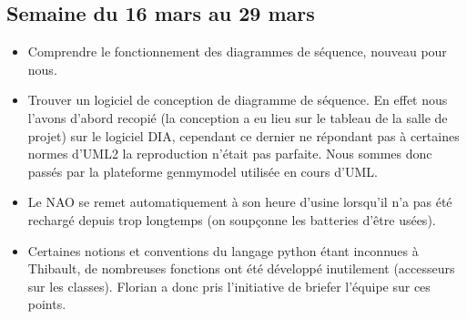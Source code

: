   \subsection{Semaine du 16 mars au 29 mars}
  \label{sub:Semaine du 16 mars au 29 mars}
    \begin{itemize}
      \item Comprendre le fonctionnement des diagrammes de séquence, nouveau pour nous.
      \item Trouver un logiciel de conception de diagramme de séquence.
      En effet nous l’avons d’abord recopié (la conception a eu lieu sur le tableau de la salle de projet) sur le logiciel DIA,
      cependant ce dernier ne répondant pas à certaines normes d’UML2 la reproduction n’était pas parfaite.
      Nous sommes donc passés par la plateforme genmymodel utilisée en cours d’UML.
      \item Le NAO se remet automatiquement à son heure d’usine lorsqu’il n’a pas été rechargé depuis trop longtemps (on soupçonne les batteries d’être usées).
      \item Certaines notions et conventions du langage python étant inconnues à Thibault, de nombreuses fonctions ont été développé inutilement (accesseurs sur les classes).
      Florian a donc pris l’initiative de briefer l’équipe sur ces points.\\
    \end{itemize}



